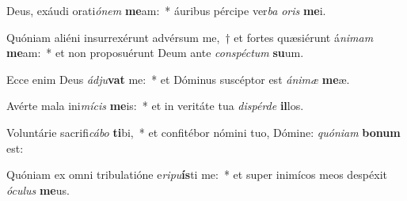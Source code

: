 \item Deus, exáudi orati\textit{ó}\textit{nem} \textbf{me}am:~* áuribus pércipe ver\textit{ba} \textit{o}\textit{ris} \textbf{me}i.
\item Quóniam aliéni insurrexérunt advérsum me,~† et fortes quæsiérunt á\textit{ni}\textit{mam} \textbf{me}am:~* et non proposuérunt Deum ante \textit{con}\textit{spéc}\textit{tum} \textbf{su}um.
\item Ecce enim Deus \textit{ád}\textit{ju}\textbf{vat} me:~* et Dóminus suscéptor est \textit{á}\textit{ni}\textit{mæ} \textbf{me}æ.
\item Avérte mala ini\textit{mí}\textit{cis} \textbf{me}is:~* et in veritáte tua \textit{dis}\textit{pér}\textit{de} \textbf{il}los.
\item Voluntárie sacrifi\textit{cá}\textit{bo} \textbf{ti}bi,~* et confitébor nómini tuo, Dómine: \textit{quón}\textit{i}\textit{am} \textbf{bo}\textbf{num} est:
\item Quóniam ex omni tribulatióne e\textit{ri}\textit{pu}\textbf{ís}ti me:~* et super inimícos meos despéxit \textit{ó}\textit{cu}\textit{lus} \textbf{me}us.
